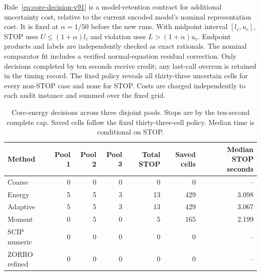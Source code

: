 Rule~\eqref{eq:core-decision-v91} is a model-retention contract for additional uncertainty cost, relative to the current encoded model's nominal representation cost. It is fixed at $\alpha=1/50$ before the new runs. With midpoint interval $[l_c,u_c]$, STOP uses $U\le(1+\alpha)l_c$ and violation uses $L>(1+\alpha)u_c$. Endpoint products and labels are independently checked as exact rationals. The nominal comparator fit includes a verified normal-equation residual correction. Only decisions completed by ten seconds receive credit; any last-call overrun is retained in the timing record. The fixed policy reveals all thirty-three uncertain cells for every non-STOP case and none for STOP. Costs are charged independently to each audit instance and summed over the fixed grid.

\begin{table}[t]\centering\small
\caption{Core-energy decisions across three disjoint pools. Stops are by the ten-second complete cap. Saved cells follow the fixed thirty-three-cell policy. Median time is conditional on STOP.}
\label{tab:core-decisions-v91}
\begin{tabular}{lrrrrrr}\toprule Method&Pool 1&Pool 2&Pool 3&Total STOP&Saved cells&Median STOP seconds\\\midrule
Coarse & 0 & 0 & 0 & 0 & 0 & --\\
Energy & 5 & 5 & 3 & 13 & 429 & 3.098\\
Adaptive & 5 & 5 & 3 & 13 & 429 & 3.067\\
Moment & 0 & 5 & 0 & 5 & 165 & 2.199\\
SCIP numeric & 0 & 0 & 0 & 0 & 0 & --\\
ZORRO refined & 0 & 0 & 0 & 0 & 0 & --\\
\bottomrule\end{tabular}\end{table}
